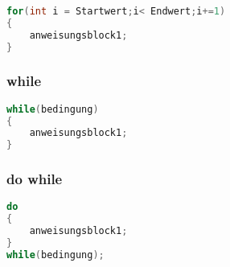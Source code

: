 \noindent
\begin{minipage}{0.6\columnwidth}
    \begin{center}
    \end{center}
\end{minipage}
\begin{minipage}{0.4\columnwidth} 
\begin{lstlisting}[language = c]
for(int i = Startwert;i< Endwert;i+=1)
{
    anweisungsblock1;
}
\end{lstlisting}
\end{minipage}

\subsubsection{while}

\noindent
\begin{minipage}{0.4\columnwidth}
    \begin{center}
    \end{center}
\end{minipage}
\begin{minipage}{0.6\columnwidth} 
\begin{lstlisting}[language = c]
while(bedingung)
{
    anweisungsblock1;
}
\end{lstlisting}
\end{minipage}

\subsubsection{do while}

\noindent
\begin{minipage}{0.4\columnwidth}
    \begin{center}
    \end{center}
\end{minipage}
\begin{minipage}{0.6\columnwidth} 
\begin{lstlisting}[language = c]
do
{
    anweisungsblock1;
}
while(bedingung);
\end{lstlisting}
\end{minipage}

\nextcol		
